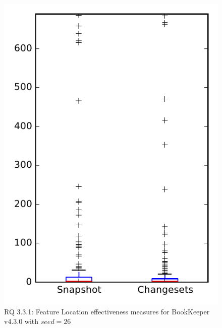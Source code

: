 
\begin{figure}
\centering
\includegraphics[height=0.4\textheight]{figures/flt_seed/rq1_bookkeeper_26}
\caption{RQ 3.3.1: Feature Location effectiveness measures for BookKeeper v4.3.0 with $seed=26$}
\label{fig:flt_seed:rq1:bookkeeper}
\end{figure}
